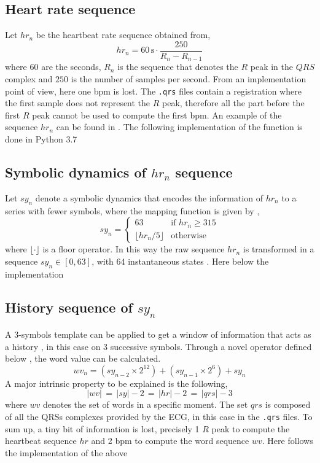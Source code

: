 \subsection{Heart rate sequence}
Let $hr_n$ be the heartbeat rate sequence obtained from,
\begin{equation}
hr_n = 60\, \text{s} \cdot \frac{250}{R_n - R_{n-1}}
\end{equation}
where $60$ are the seconds, $R_n$ is the sequence that denotes the $R$ peak in the $QRS$ complex and $250$ is the number of samples per second. From an implementation point of view, here one bpm is lost. The \verb|.qrs| files contain a registration where the first sample does not represent the $R$ peak, therefore all the part before the first $R$ peak cannot be used to compute the first bpm. An example of the sequence $hr_n$ can be found in . The following implementation of the function is done in Python 3.7

\subsection{Symbolic dynamics of $hr_n$ sequence}
Let $sy_n$ denote a symbolic dynamics that encodes the information of $hr_n$ to a series with fewer symbols, where the mapping function is given by \cite[p. 3]{zhou2015},
\begin{equation}
sy_n = \begin{cases}
63 & \text{if $hr_n \ge 315$} \\
\lfloor hr_n / 5 \rfloor & \text{otherwise}
\end{cases}
\end{equation}
where $\lfloor \cdot \rfloor$ is a floor operator. In this way the raw sequence $hr_n$ is transformed in a sequence $sy_n \in [0, 63]$, with 64 instantaneous states . Here below the implementation

\subsection{History sequence of $sy_n$}
A 3-symbols template can be applied to get a window of information that acts as a history , in this case on 3 successive symbols. Through a novel operator defined below \cite[p. 3]{zhou2015}, the word value can be calculated. 
\begin{equation}
wv_n = (sy_{n-2} \times 2^{12}) + (sy_{n-1} \times 2^{6}) + sy_n
\end{equation}
A major intrinsic property to be explained is the following,
\begin{equation}
|wv| \, = \, |sy| - 2 \, = \, |hr| - 2 \, = \, |qrs| - 3  
\end{equation}
where $wv$ denotes the set of words in a specific moment. The set $qrs$ is composed of all the QRSs complexes provided by the ECG, in this case in the \verb|.qrs| files. To sum up, a tiny bit of information is lost, precisely 1 $R$ peak to compute the heartbeat sequence $hr$ and 2 bpm to compute the word sequence $wv$. Here follows the implementation of the above

